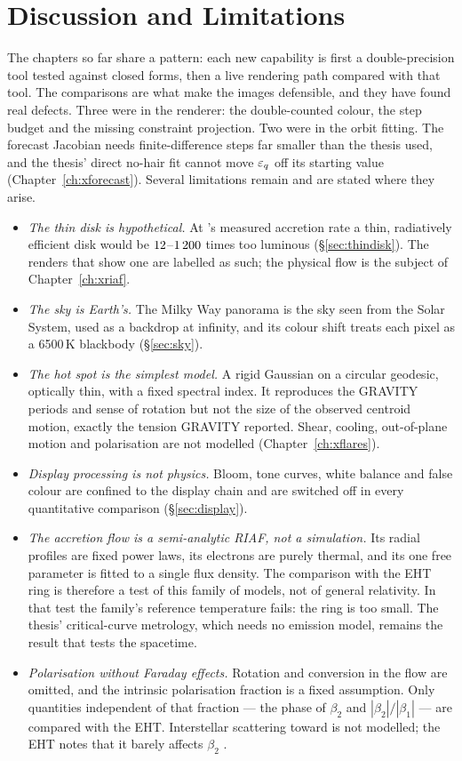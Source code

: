\chapter{Discussion and Limitations}
\label{ch:xdiscussion}

The chapters so far share a pattern: each new capability is first a
double-precision tool tested against closed forms, then a live rendering
path compared with that tool. The comparisons are what make the images
defensible, and they have found real defects. Three were in the renderer:
the double-counted colour, the step budget and the missing constraint
projection. Two were in the orbit fitting. The forecast Jacobian needs
finite-difference steps far smaller than the thesis used, and the thesis'
direct no-hair fit cannot move $\varepsilon_q$ off its starting value
(Chapter~\ref{ch:xforecast}). Several limitations remain and are stated
where they arise.

\begin{itemize}
\item \emph{The thin disk is hypothetical.} At \sgra's measured accretion
rate a thin, radiatively efficient disk would be $12$--$1\,200$
times too luminous (\S\ref{sec:thindisk}). The renders that show one are
labelled as such; the physical flow is the subject of
Chapter~\ref{ch:xriaf}.
\item \emph{The sky is Earth's.} The Milky Way panorama is the sky seen from
the Solar System, used as a backdrop at infinity, and its colour shift treats
each pixel as a 6500\,K blackbody (\S\ref{sec:sky}).
\item \emph{The hot spot is the simplest model.} A rigid Gaussian on a
circular geodesic, optically thin, with a fixed spectral index. It
reproduces the GRAVITY periods and sense of rotation but not the size of the
observed centroid motion, exactly the tension GRAVITY reported. Shear, cooling,
out-of-plane motion and polarisation are not modelled
(Chapter~\ref{ch:xflares}).
\item \emph{Display processing is not physics.} Bloom, tone curves, white
balance and false colour are confined to the display chain and are switched
off in every quantitative comparison (\S\ref{sec:display}).
\item \emph{The accretion flow is a semi-analytic RIAF, not a simulation.}
Its radial profiles are fixed power laws, its electrons are purely thermal,
and its one free parameter is fitted to a single flux density. The
comparison with the EHT ring is therefore a test of this family of models,
not of general relativity. In that test the family's reference temperature
fails: the ring is too small. The thesis' critical-curve metrology, which
needs no emission model, remains the result that tests the spacetime.
\item \emph{Polarisation without Faraday effects.} Rotation and conversion in
the flow are omitted, and the intrinsic polarisation fraction is a fixed
assumption. Only quantities independent of that fraction --- the phase of
$\beta_2$ and $|\beta_2|/|\beta_1|$ --- are compared with the EHT. Interstellar
scattering toward \sgra{} is not modelled; the EHT notes that it barely
affects $\beta_2$ \citep{EHT2024pol}.
\end{itemize}

